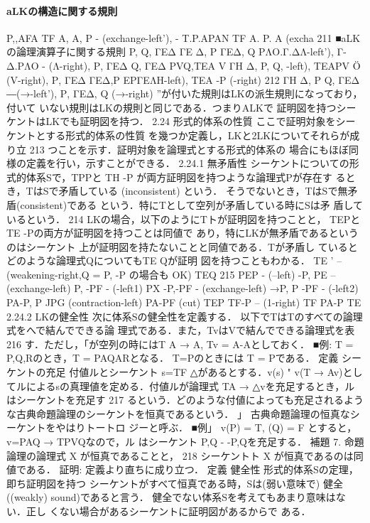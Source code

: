 \documentclass{ltjsarticle}
\theoremstyle{mystyle1}
\theoremstyle{mystyle2}
\begin{document}
\paragraph{aLKの構造に関する規則}
P,,AFA
TF A, A, P - (exchange-left'), - T.P.APAN
TF A. P. A (excha
211
■aLKの論理演算子に関する規則
P, Q, ΓΕΔ ΓΕ Δ, Ρ ΓΕΔ, Q ΡΛΟ.Γ.ΔΛ-left'), Γ-Δ.ΡΛΟ
- (Λ-right),
Ρ, ΓΕΔ Q, ΓΕΔ
PVQ,TEA V
ΓΗ Δ, P, Q, -left), TEAPV Ö (V-right),
Ρ, ΓΕΔ
ΓΕΔ,P ΕΡΓΕΛΗ-left),
TEA -P (-right)
212
ΓΗ Δ, P
Q, ΓΕΔ
―(→-left'),
Ρ, ΓΕΔ, Q
(→-right)
”が付いた規則はLKの派生規則になっており，付いて いない規則はLKの規則と同じである．つまりALKで 証明図を持つシーケントはLKでも証明図を持つ．
2.24 形式的体系の性質
ここで証明対象をシーケントとする形式的体系の性質 を幾つか定義し，LKと2LKについてそれらが成り立
213
つことを示す．証明対象を論理式とする形式的体系の 場合にもほぼ同様の定義を行い，示すことができる．
2.24.1 無矛盾性
シーケントについての形式的体系Sで，TPPと TH -P が両方証明図を持つような論理式Pが存在す るとき，TはSで矛盾している (inconsistent) という． そうでないとき，TはSで無矛盾(consistent)である という．特にTとして空列が矛盾している時にSは矛 盾しているという．
214
LKの場合，以下のようにTトが証明図を持つことと， TEPとTE -Pの両方が証明図を持つことは同値で あり，特にLKが無矛盾であるというのはシーケント 上が証明図を持たないことと同値である．Tが矛盾し
ているとどのような論理式QについてもTE Qが証明 図を持つこともわかる．
TE
' -- (weakening-right,Q = P, -P の場合も OK)
TEQ
215
PEP
- (--left) -P, PE
– (exchange-left) P, -PF
- (-left1) PX -P,-PF
- (exchange-left) →P, P  -PF
- (-left2) PA-P, P  JPG
(contraction-left) PA-PF
(cut)
TEP TF-P
– (1-right) TF PA-P
TE
2.24.2 LKの健全性
次に体系Sの健全性を定義する． 以下でTはTのすべての論理式をへで結んでできる論 理式である．また，TvはVで結んでできる論理式を表
216
す．ただし，「が空列の時にはT A → A, Tv = A-Aとしておく．
■例:
T = P,Q,Rのとき，T = PAQARとなる． T=Pのときには T = Pである．
定義 シーケントの充足 付値ルとシーケント s=TF △があるとする．v(s) " v(T  → Av)とし てルによるsの真理値を定める．付値ルが論理式 TA → △vを充足するとき，ルはシーケントを充足す
217
るという．どのような付値によっても充足されるよう な古典命題論理のシーケントを恒真であるという． 」
古典命題論理の恒真なシーケントをやはりトートロ ジーと呼ぶ．
■例」
v(P) = T, (Q) = F とすると， v=PAQ → TPVQなので，ル はシーケント P,Q - -P,Qを充足する．
補題 7. 命題論理の論理式 X が恒真であることと，
218
シーケントト X が恒真であるのは同値である．
証明: 定義より直ちに成り立つ．
定義 健全性 形式的体系Sの定理，即ち証明図を持つ シーケントがすべて恒真である時，Sは(弱い意味で) 健全((weakly) sound)であると言う．
健全でない体系Sを考えてもあまり意味はない．正し くない場合があるシーケントに証明図があるからで ある．
\end{document}
